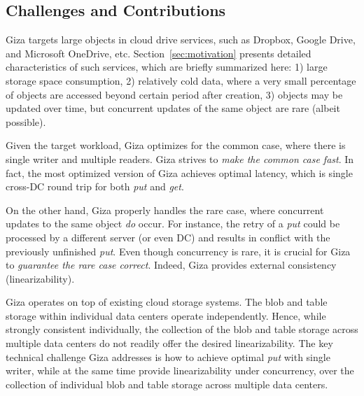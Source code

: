 \subsection{Challenges and Contributions}

Giza targets large objects in cloud drive services, such as
Dropbox, Google Drive, and Microsoft OneDrive, etc.
Section~\ref{sec:motivation} presents detailed characteristics of such services,
which are briefly summarized here:
1) large storage space consumption,
2) relatively cold data, where a very small percentage of objects are accessed
beyond certain period after creation,
3) objects may be updated over time, but concurrent updates of the same
object are rare (albeit possible).

Given the target workload, Giza optimizes for the common case, where there is
single writer and multiple readers. Giza strives to {\em make the common case
  fast}. In fact, the most optimized version of Giza achieves optimal latency,
which is single cross-DC round trip for both {\em put} and {\em get}.

On the other hand, Giza properly handles the rare case,
where concurrent updates to the same object {\em do} occur.
For instance,
the retry of a {\em put} could be processed by a different server (or even DC)
and results in conflict with the previously unfinished {\em put}.
Even though concurrency is rare,
it is crucial for Giza to {\em guarantee the rare case correct}.
Indeed, Giza provides external consistency (linearizability).

Giza operates on top of existing cloud storage systems. 
The blob and table storage within individual data centers operate independently.
Hence, while strongly consistent individually, the collection of the blob and
table storage across multiple data centers do not readily offer the desired
linearizability. The key technical challenge Giza addresses is how to achieve
optimal {\em put} with single writer, while at the same time provide
linearizability under concurrency, over the collection of individual blob and
table storage across multiple data centers.

